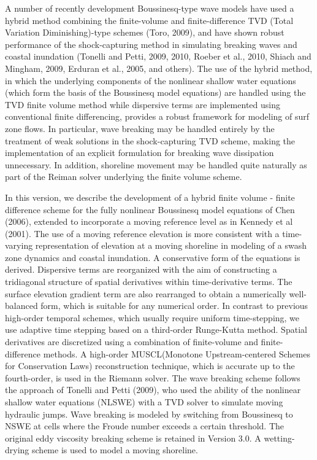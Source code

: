 \documentclass[11pt]{article}
\begin{document}
A number of recently development  Boussinesq-type wave models have used a hybrid method  combining the finite-volume and finite-difference TVD (Total Variation Diminishing)-type schemes (Toro, 2009),  and have shown robust performance of the shock-capturing method in simulating breaking waves and coastal inundation (Tonelli and Petti, 2009, 2010, Roeber et al., 2010, Shiach and Mingham, 2009, Erduran et al., 2005, and others). The use of the hybrid method, in which the underlying components of the nonlinear shallow water equations (which form the basis of the Boussinesq model equations) are handled using the TVD finite volume method while dispersive terms are implemented using conventional finite differencing, provides a robust framework for modeling of surf zone flows.  In particular, wave breaking may be handled entirely by the treatment of weak solutions in the shock-capturing TVD scheme, making the implementation of an explicit formulation for breaking wave dissipation unnecessary.   In addition, shoreline movement may be handled quite naturally as part of the Reiman solver underlying the finite volume scheme.


In this version, we describe the development of a hybrid finite volume - finite difference scheme for the fully nonlinear Boussinesq model equations of Chen (2006), extended to incorporate a moving reference level as in Kennedy et al (2001).  The use of a moving reference elevation  is more consistent with a time-varying representation of elevation at a moving shoreline in modeling of a swash zone dynamics and coastal inundation.  
A conservative form of the equations is derived.  Dispersive terms are reorganized  with the aim of constructing a tridiagonal structure of spatial derivatives within time-derivative terms. The surface elevation gradient term are also rearranged to obtain a numerically well-balanced form, which is suitable for any numerical order.    In contrast to previous  high-order temporal schemes, which usually require uniform time-stepping, we use adaptive time stepping based on a third-order Runge-Kutta method.  
Spatial derivatives are discretized using a combination of finite-volume and finite-difference methods. A high-order MUSCL(Monotone Upstream-centered Schemes for Conservation Laws) reconstruction technique, which is accurate up to the fourth-order,  is used in the Riemann solver.  The wave breaking scheme follows the approach of Tonelli and Petti (2009),  who used the ability of the nonlinear shallow water equations (NLSWE) with a TVD solver to simulate moving hydraulic jumps. Wave breaking is modeled by switching from Boussinesq to NSWE at cells where the Froude number exceeds a certain threshold. The original eddy viscosity breaking scheme is retained in Version 3.0. A  wetting-drying scheme is used to model a moving shoreline. 
\end{document}
